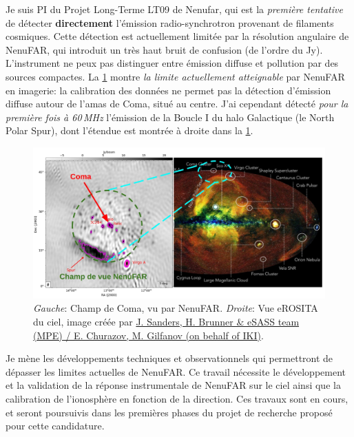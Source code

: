 \pg
Je suis PI du Projet Long-Terme LT09 de Nenufar, qui est la \textit{premi\`ere tentative} de d\'etecter \textbf{directement} l'\'emission radio-synchrotron provenant de filaments cosmiques. Cette d\'etection est actuellement limit\'ee par la r\'esolution angulaire de NenuFAR, qui introduit un tr\`es haut bruit de confusion (de l'ordre du Jy). L'instrument ne peux pas distinguer entre \'emission diffuse et pollution par des sources compactes. La \cref{fig.coma.nenufar} montre \textit{la limite actuellement atteignable} par NenuFAR en imagerie: la calibration des donn\'ees ne permet pas la d\'etection d'\'emission diffuse autour de l'amas de Coma, situ\'e au centre. J'ai cependant d\'etect\'e \textit{pour la premi\`ere fois \`a 60\,MHz} l'\'emission de la Boucle I du halo Galactique (le North Polar Spur), dont l'\'etendue est montr\'ee \`a droite dans la \cref{fig.coma.nenufar}. %
\begin{figure}[H]
	\includegraphics[width=\linewidth]{nenufar_coma.jpeg}
	\caption{\textit{Gauche}: Champ de Coma, vu par NenuFAR. \textit{Droite}: Vue eROSITA du ciel, image cr\'e\'ee par \href{https://skyandtelescope.org/astronomy-news/what-and-where-is-the-north-polar-spur/}{J. Sanders, H. Brunner \& eSASS team (MPE) / E. Churazov, M. Gilfanov (on behalf of IKI)}.} \label{fig.coma.nenufar}
\end{figure}


\pg
Je m\`ene les d\'eveloppements techniques et observationnels qui permettront de d\'epasser les limites actuelles de NenuFAR.
Ce travail n\'ecessite le d\'eveloppement et la validation de la r\'eponse instrumentale de NenuFAR sur le ciel ainsi que la calibration de l'ionosph\`ere en fonction de la direction. Ces travaux sont en cours, et seront poursuivis dans les premi\`eres phases du projet de recherche propos\'e pour cette candidature.%

